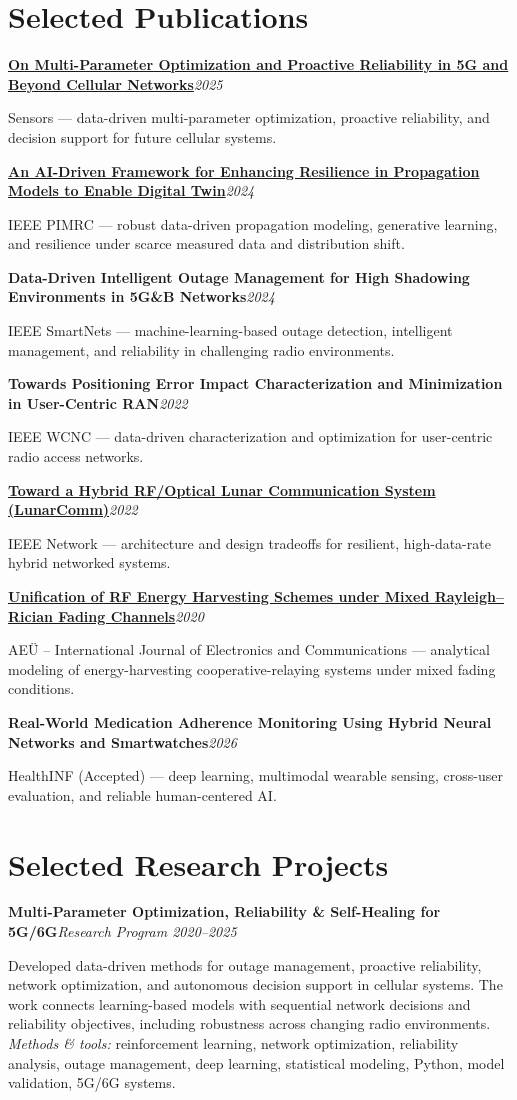 \documentclass[9pt,letterpaper]{extarticle}
\newcommand{\project}[3]{\Needspace{5\baselineskip}\textbf{#1}\hfill\textit{#2 \textbar{} #3}\par}
\newcommand{\pub}[3]{\Needspace{3\baselineskip}\textbf{#1}\hfill\textit{#2}\par{\small #3\par}}
\begin{document}
\section{Selected Publications}
\pub{\href{https://doi.org/10.3390/s25247651}{On Multi-Parameter Optimization and Proactive Reliability in 5G and Beyond Cellular Networks}}{2025}{Sensors --- data-driven multi-parameter optimization, proactive reliability, and decision support for future cellular systems.}
\pub{\href{https://doi.org/10.1109/PIMRC59610.2024.10817403}{An AI-Driven Framework for Enhancing Resilience in Propagation Models to Enable Digital Twin}}{2024}{IEEE PIMRC --- robust data-driven propagation modeling, generative learning, and resilience under scarce measured data and distribution shift.}
\pub{Data-Driven Intelligent Outage Management for High Shadowing Environments in 5G\&B Networks}{2024}{IEEE SmartNets --- machine-learning-based outage detection, intelligent management, and reliability in challenging radio environments.}
\pub{Towards Positioning Error Impact Characterization and Minimization in User-Centric RAN}{2022}{IEEE WCNC --- data-driven characterization and optimization for user-centric radio access networks.}
\pub{\href{https://arxiv.org/abs/2203.15899}{Toward a Hybrid RF/Optical Lunar Communication System (LunarComm)}}{2022}{IEEE Network --- architecture and design tradeoffs for resilient, high-data-rate hybrid networked systems.}
\pub{\href{https://doi.org/10.1016/j.aeue.2020.153244}{Unification of RF Energy Harvesting Schemes under Mixed Rayleigh--Rician Fading Channels}}{2020}{AEÜ -- International Journal of Electronics and Communications --- analytical modeling of energy-harvesting cooperative-relaying systems under mixed fading conditions.}
\pub{Real-World Medication Adherence Monitoring Using Hybrid Neural Networks and Smartwatches}{2026}{HealthINF (Accepted) --- deep learning, multimodal wearable sensing, cross-user evaluation, and reliable human-centered AI.}

\section{Selected Research Projects}
\project{Multi-Parameter Optimization, Reliability \& Self-Healing for 5G/6G}{Research Program}{2020--2025}
Developed data-driven methods for outage management, proactive reliability, network optimization, and autonomous decision support in cellular systems. The work connects learning-based models with sequential network decisions and reliability objectives, including robustness across changing radio environments.\\[-1pt]
{\small\textit{Methods \& tools:} reinforcement learning, network optimization, reliability analysis, outage management, deep learning, statistical modeling, Python, model validation, 5G/6G systems.}
\end{document}
